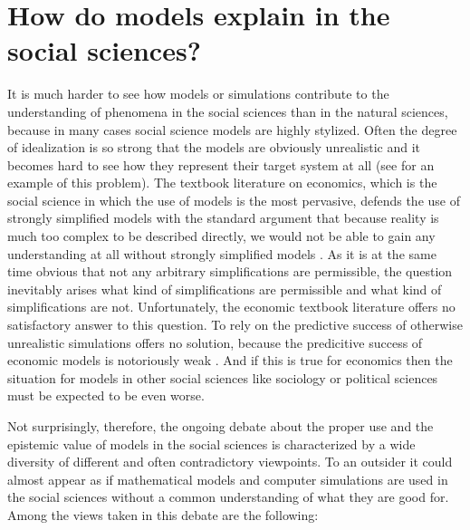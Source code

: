 \documentclass[onecollarge]{STJour}
\numberwithin{equation}{section}
\begin{document}
\section{How do models explain in the social sciences?}

It is much harder to see how models or simulations contribute to the
understanding of phenomena in the social sciences than in the natural
sciences, because in many cases social science models are highly
stylized. Often the degree of idealization is so strong that the models
are obviously unrealistic and it becomes hard to see how they represent
their target system at all (see \citet{hammerstein:2003} for an example
of this problem). The textbook literature on economics, which is the
social science in which the use of models is the most pervasive, defends
the use of strongly simplified models with the standard argument that
because reality is much too complex to be described directly, we would
not be able to gain any understanding at all without strongly simplified
models \cite[p.\ 22ff.]{mankiw:2004}. As it is at the same time obvious
that not any arbitrary simplifications are permissible, the question
inevitably arises what kind of simplifications are permissible and what kind of
simplifications are not. Unfortunately, the economic textbook literature
offers no satisfactory answer to this question. To rely on the predictive
success of otherwise unrealistic simulations offers no solution, because
 the predicitive success of economic models is
notoriously weak \citep[]{betz:2006}. And if this is true for economics
then the situation for models in other social sciences like sociology or
political sciences must be expected to be even worse.

Not surprisingly, therefore, the ongoing debate about the proper use and
the epistemic value of models in the social sciences is characterized by
a wide diversity of different and often contradictory viewpoints. To an
outsider it could almost appear as if mathematical models and computer
simulations are used in the social sciences without a common
understanding of what they are good for. Among the views taken in this
debate are the following:
\end{document}
